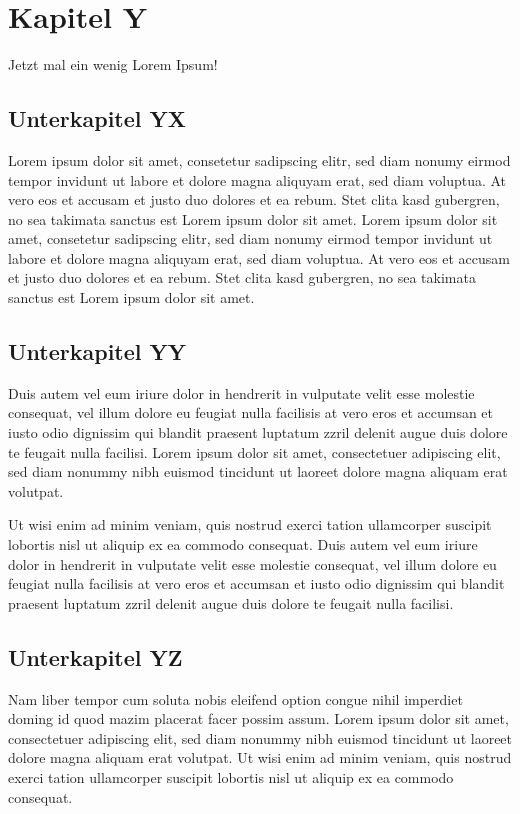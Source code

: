 \documentclass[a4paper,12pt,ngerman,oneside]{scrreprt}	%
\begin{document}
		
	\chapter{Kapitel Y}
	Jetzt mal ein wenig Lorem Ipsum!
		\section{Unterkapitel YX}
		Lorem ipsum dolor sit amet, consetetur sadipscing elitr, sed diam nonumy eirmod tempor invidunt ut labore et dolore magna aliquyam erat, sed diam voluptua. At vero eos et accusam et justo duo dolores et ea rebum. Stet clita kasd gubergren, no sea takimata sanctus est Lorem ipsum dolor sit amet. Lorem ipsum dolor sit amet, consetetur sadipscing elitr, sed diam nonumy eirmod tempor invidunt ut labore et dolore magna aliquyam erat, sed diam voluptua. At vero eos et accusam et justo duo dolores et ea rebum. Stet clita kasd gubergren, no sea takimata sanctus est Lorem ipsum dolor sit amet.
		
		\section{Unterkapitel YY }
		Duis autem vel eum iriure dolor in hendrerit in vulputate velit esse molestie consequat, vel illum dolore eu feugiat nulla facilisis at vero eros et accumsan et iusto odio dignissim qui blandit praesent luptatum zzril delenit augue duis dolore te feugait nulla facilisi. Lorem ipsum dolor sit amet, consectetuer adipiscing elit, sed diam nonummy nibh euismod tincidunt ut laoreet dolore magna aliquam erat volutpat. \break
		
		Ut wisi enim ad minim veniam, quis nostrud exerci tation ullamcorper suscipit lobortis nisl ut aliquip ex ea commodo consequat. Duis autem vel eum iriure dolor in hendrerit in vulputate velit esse molestie consequat, vel illum dolore eu feugiat nulla facilisis at vero eros et accumsan et iusto odio dignissim qui blandit praesent luptatum zzril delenit augue duis dolore te feugait nulla facilisi.   
		
		\section{Unterkapitel YZ}
		Nam liber tempor cum soluta nobis eleifend option congue nihil imperdiet doming id quod mazim placerat facer possim assum. Lorem ipsum dolor sit amet, consectetuer adipiscing elit, sed diam nonummy nibh euismod tincidunt ut laoreet dolore magna aliquam erat volutpat. Ut wisi enim ad minim veniam, quis nostrud exerci tation ullamcorper suscipit lobortis nisl ut aliquip ex ea commodo consequat.   
		
\end{document}
